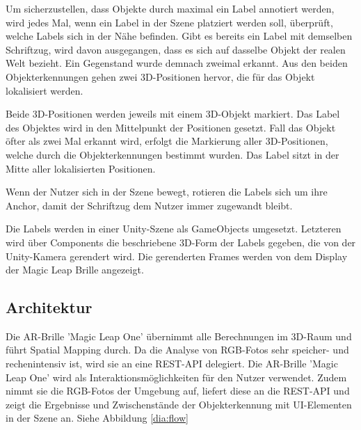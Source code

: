 Um sicherzustellen, dass Objekte durch maximal ein Label annotiert werden, wird jedes Mal, wenn ein Label in der Szene platziert werden soll, überprüft, welche Labels sich in der Nähe befinden. Gibt es bereits ein Label mit demselben Schriftzug, wird davon ausgegangen, dass es sich auf dasselbe Objekt der realen Welt bezieht. Ein Gegenstand wurde demnach zweimal erkannt. Aus den beiden Objekterkennungen gehen zwei 3D-Positionen hervor, die für das Objekt lokalisiert werden. 

Beide 3D-Positionen werden jeweils mit einem 3D-Objekt markiert. Das Label des Objektes wird in den Mittelpunkt der Positionen gesetzt. Fall das Objekt öfter als zwei Mal erkannt wird, erfolgt die Markierung aller 3D-Positionen, welche durch die Objekterkennungen bestimmt wurden. Das Label sitzt in der Mitte aller lokalisierten Positionen.

Wenn der Nutzer sich in der Szene bewegt, rotieren die Labels sich um ihre Anchor, damit der Schriftzug dem Nutzer immer zugewandt bleibt.

Die Labels werden in einer Unity-Szene als GameObjects umgesetzt. Letzteren wird über Components die beschriebene 3D-Form der Labels gegeben, die von der Unity-Kamera gerendert wird. Die gerenderten Frames werden von dem Display der Magic Leap Brille angezeigt. 

\subsection{Architektur}

Die AR-Brille 'Magic Leap One' übernimmt alle Berechnungen im 3D-Raum und führt Spatial Mapping durch. Da die Analyse von RGB-Fotos sehr speicher- und rechenintensiv ist, wird sie an eine REST-API delegiert. Die AR-Brille 'Magic Leap One' wird als Interaktionsmöglichkeiten für den Nutzer verwendet. Zudem nimmt sie die RGB-Fotos der Umgebung auf, liefert diese an die REST-API und zeigt die Ergebnisse und Zwischenstände der Objekterkennung mit UI-Elementen in der Szene an. Siehe Abbildung \ref{dia:flow}

